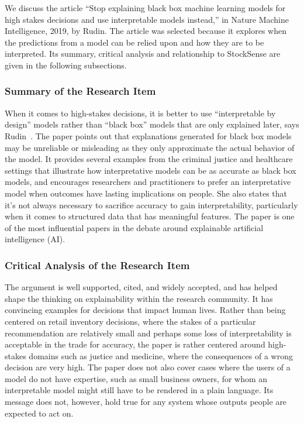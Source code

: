 \documentclass{StockSense}
\begin{document}
We discuss the article ``Stop explaining black box machine learning models for high stakes decisions and use interpretable models instead,'' in Nature Machine Intelligence, 2019, by Rudin. The article was selected because it explores when the predictions from a model can be relied upon and how they are to be interpreted. Its summary, critical analysis and relationship to StockSense are given in the following subsections.

\subsubsection{Summary of the Research Item}

When it comes to high-stakes decisions, it is better to use “interpretable by design” models rather than “black box” models that are only explained later, says Rudin~\cite{rudin2019stop}. The paper points out that explanations generated for black box models may be unreliable or misleading as they only approximate the actual behavior of the model. It provides several examples from the criminal justice and healthcare settings that illustrate how interpretative models can be as accurate as black box models, and encourages researchers and practitioners to prefer an interpretative model when outcomes have lasting implications on people. She also states that it's not always necessary to sacrifice accuracy to gain interpretability, particularly when it comes to structured data that has meaningful features. The paper is one of the most influential papers in the debate around explainable artificial intelligence (AI).

\subsubsection{Critical Analysis of the Research Item}

The argument is well supported, cited, and widely accepted, and has helped shape the thinking on explainability within the research community. It has convincing examples for decisions that impact human lives. Rather than being centered on retail inventory decisions, where the stakes of a particular recommendation are relatively small and perhaps some loss of interpretability is acceptable in the trade for accuracy, the paper is rather centered around high-stakes domains such as justice and medicine, where the consequences of a wrong decision are very high. The paper does not also cover cases where the users of a model do not have expertise, such as small business owners, for whom an interpretable model might still have to be rendered in a plain language. Its message does not, however, hold true for any system whose outputs people are expected to act on.
\end{document}
